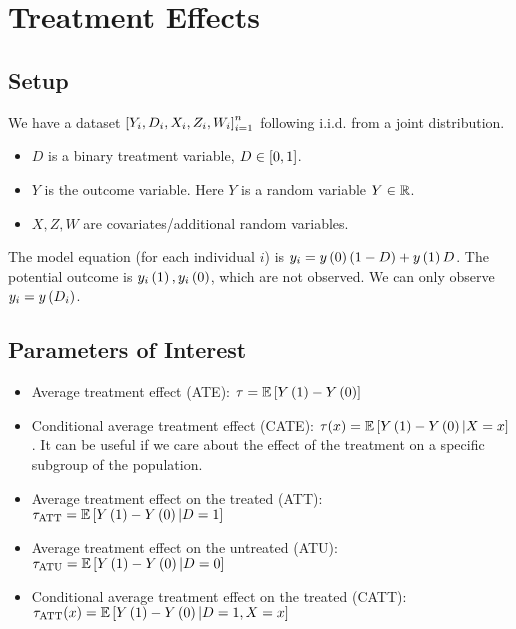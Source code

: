\section{Treatment Effects}
\subsection{Setup} We have a dataset $\left[Y_i,D_i,X_i,Z_i,W_i\right]_{i=1}^n$ following i.i.d. from a
joint distribution.
\begin{itemize}
    \item $D$ is a binary treatment variable, $D\in\left[0,1\right]$.
    \item $Y$ is the outcome variable. Here $Y$ is a random variable $Y\in \mathbb{R}$.
    \item $X,Z,W$ are covariates/additional random variables.
\end{itemize}
The model equation (for each individual $i$) is $y_i=y\left(0\right)(1-D)+y\left(1\right)D$. The potential outcome is $y_i\left(1\right),y_i\left(0\right)$, which are not observed. We can only observe $y_i=y\left(D_i\right)$.

\subsection{Parameters of Interest}
\begin{itemize}
    \item Average treatment effect (ATE): $\tau = \mathbb{E}\left[Y\left(1\right)-Y\left(0\right)\right]$
    \item Conditional average treatment effect (CATE): $\tau(x) =
              \mathbb{E}\left[Y\left(1\right)-Y\left(0\right)|X=x\right]$. It can be useful if we care about the effect of
          the treatment on a specific subgroup of the population.
    \item Average treatment effect on the treated (ATT): $\tau_{\text{ATT}} =
              \mathbb{E}\left[Y\left(1\right)-Y\left(0\right)|D=1\right]$
    \item Average treatment effect on the untreated (ATU): $\tau_{\text{ATU}} =
              \mathbb{E}\left[Y\left(1\right)-Y\left(0\right)|D=0\right]$
    \item Conditional average treatment effect on the treated (CATT):
          $\tau_{\text{ATT}}(x) = \mathbb{E}\left[Y\left(1\right)-Y\left(0\right)|D=1,X=x\right]$
\end{itemize}


